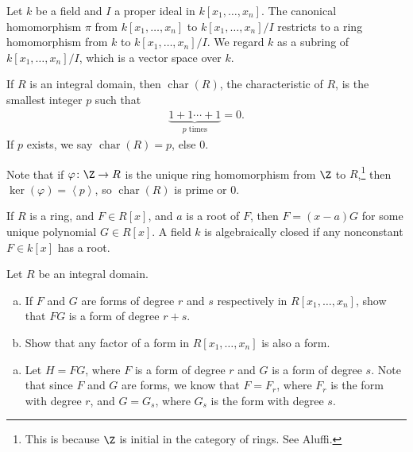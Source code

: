 \documentclass[10pt]{mypackage}
\begin{document}
Let $k$ be a field and $I$ a proper ideal in $k\left[x_1,\dots,x_n\right]$. The canonical homomorphism $\pi$ from $k\left[x_1,\dots,x_n\right]$ to $k\left[x_1,\dots,x_n\right]/I$ restricts to a ring homomorphism from $k$ to $k\left[x_1,\dots,x_n\right]/I$. We regard $k$ as a subring of $k\left[x_1,\dots,x_n\right]/I$, which is a vector space over $k$.\newline

If $R$ is an integral domain, then $\operatorname{char}\left(R\right)$, the characteristic of $R$, is the smallest integer $p$ such that 
\begin{align*}
  \underbrace{1+1\cdots +1}_{p\text{ times}} = 0. 
\end{align*}
If $p$ exists, we say $\operatorname{char}\left(R\right) = p$, else $0$.\newline

Note that if $\varphi\colon \Z\rightarrow R$ is the unique ring homomorphism from $\Z$ to $R$,\footnote{This is because $\Z$ is initial in the category of rings. See Aluffi.} then $\ker\left(\varphi\right) = \left\langle p \right\rangle$, so $\operatorname{char}\left(R\right)$ is prime or $0$.\newline

If $R$ is a ring, and $F\in R\left[x\right]$, and $a$ is a root of $F$, then $F = \left(x-a\right)G$ for some unique polynomial $G\in R[x]$. A field $k$ is algebraically closed if any nonconstant $F\in k\left[x\right]$ has a root.
\begin{exercise}[Exercise 1.1]
Let $R$ be an integral domain.
\begin{enumerate}[(a)]
  \item If $F$ and $G$ are forms of degree $r$ and $s$ respectively in $R\left[x_1,\dots,x_n\right]$, show that $FG$ is a form of degree $r+s$.
  \item Show that any factor of a form in $R\left[x_1,\dots,x_n\right]$ is also a form.
\end{enumerate}
\end{exercise}
\begin{solution}\hfill
  \begin{enumerate}[(a)]
    \item Let $H = FG$, where $F$ is a form of degree $r$ and $G$ is a form of degree $s$. Note that since $F$ and $G$ are forms, we know that $F = F_{r}$, where $F_r$ is the form with degree $r$, and $G = G_s$, where $G_s$ is the form with degree $s$.
  \end{enumerate}
  
\end{solution}
\end{document}

